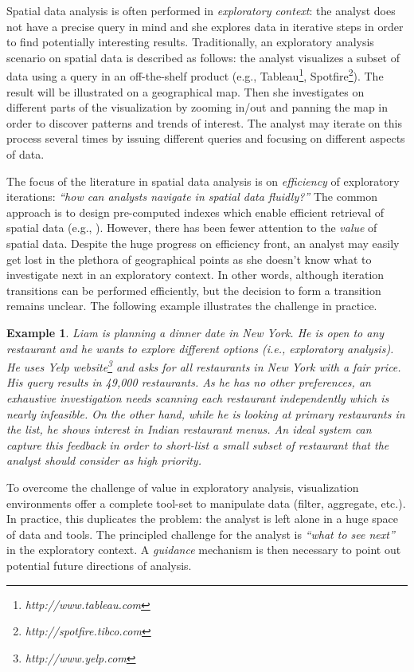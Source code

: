 \documentclass{vldb}
\newtheorem{example}{Example}
\begin{document}
Spatial data analysis is often performed in {\em exploratory context}: the analyst does not have a precise query in mind and she explores data in iterative steps in order to find potentially interesting results. Traditionally, an exploratory analysis scenario on spatial data is described as follows: the analyst visualizes a subset of data using a query in an off-the-shelf product (e.g., Tableau\footnote{\it http://www.tableau.com},
Spotfire\footnote{\it http://spotfire.tibco.com}). The result will be illustrated on a geographical map. Then she investigates on different parts of the visualization by zooming in/out and panning the map in order to discover patterns and trends of interest. The analyst may iterate on this process several times by issuing different queries and focusing on different aspects of data. 

The focus of the literature in spatial data analysis is on {\em efficiency} of exploratory iterations: {\em ``how can analysts navigate in spatial data fluidly?''} The common approach is to design pre-computed indexes which enable efficient retrieval of spatial data (e.g., \cite{lins2013nanocubes}). However, there has been fewer attention to the {\em value} of spatial data. Despite the huge progress on efficiency front, an analyst may easily get lost in the plethora of geographical points as she doesn't know what to investigate next in an exploratory context. In other words, although iteration transitions can be performed efficiently, but the decision to form a transition remains unclear. The following example illustrates the challenge in practice.

\begin{example}
\label{ex:resto}
Liam is planning a dinner date in New York. He is open to any restaurant and he wants to explore different options (i.e., exploratory analysis). He uses Yelp website\footnote{\it http://www.yelp.com} and asks for all restaurants in New York with a fair price. His query results in 49,000 restaurants. As he has no other preferences, an exhaustive investigation needs scanning each restaurant independently which is nearly infeasible. On the other hand, while he is looking at primary restaurants in the list, he shows interest in Indian restaurant menus. An ideal system can capture this feedback in order to short-list a small subset of restaurant that the analyst should consider as high priority.
\end{example}

To overcome the challenge of value in exploratory analysis, visualization environments offer a complete tool-set to manipulate data (filter, aggregate, etc.). In practice, this duplicates the problem: the analyst is left alone in a huge space of data and tools. The principled challenge for the analyst is {\em ``what to see next''} in the exploratory context. A {\em guidance} mechanism is then necessary to point out potential future directions of analysis.
\end{document}
